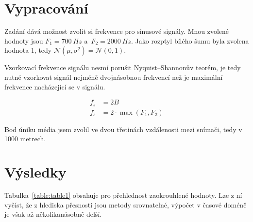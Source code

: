 \section{Vypracování}

Zadání dává možnost zvolit si frekvence pro sinusové signály.
Mnou zvolené hodnoty jsou \( F_1 = 700 \: Hz \) a~\( F_2 = 2000 \: Hz \).
Jako rozptyl bílého šumu byla zvolena hodnota 1, tedy \( \mathcal{N}(\mu, \sigma^{2}) = \mathcal{N}(0, 1) \).

Vzorkovací frekvence signálu nesmí porušit Nyquist–Shannonův teorém, je tedy nutné vzorkovat signál nejméně dvojnásobnou frekvencí než je maximální frekvence nacházející se v signálu.

\begin{align*}
    f_s &= 2B \\
    f_s &= 2 \cdot \max{(F_1, F_2)}
\end{align*}

Bod úniku média jsem zvolil ve dvou třetinách vzdálenosti mezi snímači, tedy v 1000 metrech.
 
\section{Výsledky}

Tabulka~\ref{table:table1} obsahuje pro přehlednost zaokrouhlené hodnoty.
Lze z ní vyčíst, že z hlediska přesnosti jsou metody srovnatelné, výpočet v časové doméně je však až několikanásobně delší.

